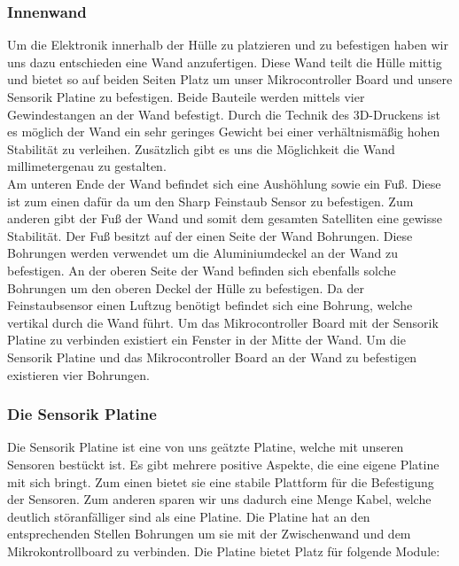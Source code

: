 \subsubsection{Innenwand}
Um die Elektronik innerhalb der Hülle zu platzieren und zu befestigen haben wir uns dazu entschieden eine Wand anzufertigen. Diese Wand teilt die Hülle mittig und bietet so auf beiden Seiten Platz um unser Mikrocontroller Board und unsere Sensorik Platine zu befestigen. Beide Bauteile werden mittels vier Gewindestangen an der Wand befestigt. Durch die Technik des 3D-Druckens ist es möglich der Wand ein sehr geringes Gewicht bei einer verhältnismäßig hohen Stabilität zu verleihen. Zusätzlich gibt es uns die Möglichkeit die Wand millimetergenau zu gestalten. \\
Am unteren Ende der Wand befindet sich eine Aushöhlung sowie ein Fuß. Diese ist zum einen dafür da um den Sharp Feinstaub Sensor zu befestigen. Zum anderen gibt der Fuß der Wand und somit dem gesamten Satelliten eine gewisse Stabilität. Der Fuß besitzt auf der einen Seite der Wand Bohrungen. Diese Bohrungen werden verwendet um die Aluminiumdeckel an der Wand zu befestigen. An der oberen Seite der Wand befinden sich ebenfalls solche Bohrungen um den oberen Deckel der Hülle zu befestigen. Da der Feinstaubsensor einen Luftzug benötigt befindet sich eine Bohrung, welche vertikal durch die Wand führt. Um das Mikrocontroller Board mit der Sensorik Platine zu verbinden existiert ein Fenster in der Mitte der Wand. Um die Sensorik Platine und das Mikrocontroller Board an der Wand zu befestigen existieren vier Bohrungen.

\subsubsection{Die Sensorik Platine}
Die Sensorik Platine ist eine von uns geätzte Platine, welche mit unseren Sensoren bestückt ist. Es gibt mehrere positive Aspekte, die eine eigene Platine mit sich bringt. Zum einen bietet sie eine stabile Plattform für die Befestigung der Sensoren. Zum anderen sparen wir uns dadurch eine Menge Kabel, welche deutlich störanfälliger sind als eine Platine. Die Platine hat an den entsprechenden Stellen Bohrungen um sie mit der Zwischenwand und dem Mikrokontrollboard zu verbinden. Die Platine bietet Platz für folgende Module:

